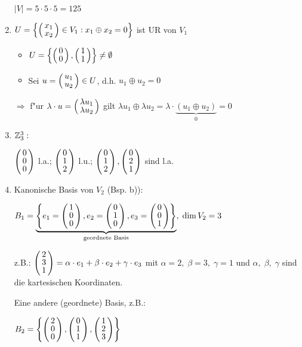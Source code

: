 \begin{enumerate}
	$|V| = 5 \cdot 5 \cdot 5 = 125$
	\item 
	$U = \left\lbrace 
	\vct{x_1 \\ x_2} \in V_1: x_1 \oplus x_2 = 0 \right\rbrace$ ist UR von $V_1$
	\begin{itemize}
		\item
		$U = \left\lbrace 
		\vct{0 \\ 0}, \vct{1 \\ 1}  \right\rbrace \neq \emptyset$
		\item
		Sei $u= \vct{u_1 \\ u_2} \in U $, d.h. $u_1 \oplus u_2 = 0$ 
	\end{itemize}
	 $\Rightarrow$ f"ur $\lambda \cdot u= \vct{\lambda u_1 \\ \lambda u_2}$ gilt $\lambda u_1 \oplus \lambda u_2 = \lambda \cdot \underbrace{(u_1 \oplus u_2)}_{0}=0$ 
	 \item
	 $\mathbb{Z}_3^3:$
	 
	 $\vct{0 \\ 0 \\ 0}$ l.a.; $\vct{0 \\ 1 \\2}$ l.u.; $\vct{0 \\ 1 \\ 2}, \vct{0 \\ 2 \\ 1}$ sind l.a.
	 \item
	 Kanonische Basis von $V_2$ (Bsp. b)):
	 
	 $B_1 = \underbrace{\aset{e_1 = \vct{1 \\ 0 \\ 0}, e_2 = \vct{0 \\ 1 \\ 0}, e_3= \vct{0 \\ 0 \\ 1}}}_{\text{geordnete Basis}},\; \dim V_2 = 3$
	 
	 z.B.: $\vct{2 \\ 3 \\ 1}= \alpha \cdot e_1 + \beta \cdot e_2 + \gamma \cdot e_3$ mit $\alpha = 2, \;\beta = 3, \;\gamma =1 $ und $\alpha, \; \beta, \; \gamma $ sind die kartesischen Koordinaten.
	 
	 Eine andere (geordnete) Basis, z.B.:
	 
	 $B_2 = \aset {\vct{2 \\ 0 \\ 0}, \vct{0 \\ 1 \\ 1}, \vct{1 \\2 \\ 3}}$
	 

\end{enumerate}
